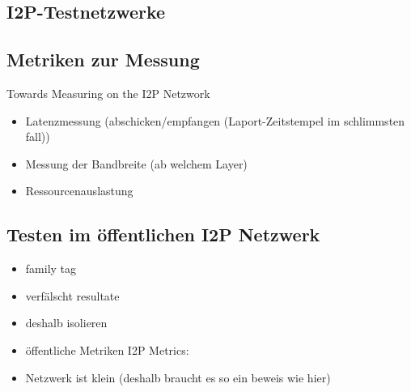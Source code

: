 \subsection{I2P-Testnetzwerke}

\subsection{Metriken zur Messung}

Towards Measuring on the I2P Netzwork
\cite{wang_towards_2013}

\begin{itemize}
    \item Latenzmessung (abschicken/empfangen (Laport-Zeitstempel im schlimmsten fall))
    \item Messung der Bandbreite (ab welchem Layer)
    \item Ressourcenauslastung
\end{itemize}

\cite{timpanaro_monitoring_nodate}

\subsection{Testen im öffentlichen I2P Netzwerk}

\begin{itemize}
    \item family tag \cite{noauthor_family_nodate}
    \item verfälscht resultate
    \item deshalb isolieren
    \item öffentliche Metriken  I2P Metrics: \cite{noauthor_i2p_nodate-4}
    \item Netzwerk ist klein (deshalb braucht es so ein beweis wie hier)
\end{itemize}

